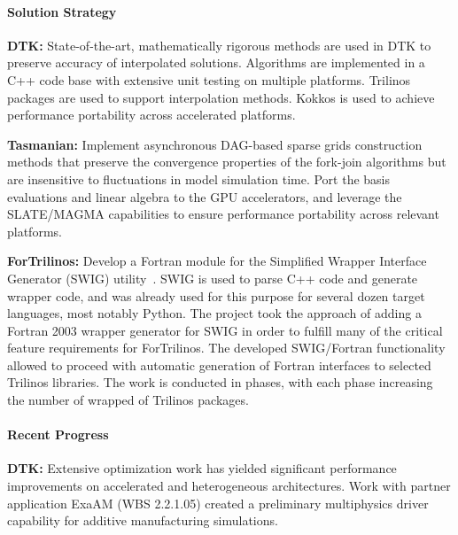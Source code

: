\paragraph{Solution Strategy}

\nobreak


\indent

{\bf DTK:} State-of-the-art, mathematically rigorous methods are used in DTK
to preserve accuracy of interpolated solutions.  Algorithms are implemented in
a C++ code base with extensive unit testing on multiple platforms.  Trilinos
packages are used to support interpolation methods.  Kokkos is used to achieve
performance portability across accelerated platforms.

{\bf Tasmanian:} Implement asynchronous DAG-based sparse grids construction
methods that preserve the convergence properties of the fork-join algorithms
but are insensitive to fluctuations in model simulation time.  Port the basis
evaluations and linear algebra to the GPU accelerators, and leverage the
SLATE/MAGMA capabilities to ensure performance portability across relevant
platforms.

{\bf ForTrilinos:} Develop a Fortran module for the Simplified Wrapper
Interface Generator (SWIG) utility~\cite{beazley1996swig}. SWIG is used to parse
C++ code and generate wrapper code, and was already used for this purpose for
several dozen target languages, most notably Python. The project took the
approach of adding a Fortran 2003 wrapper generator for SWIG in order to
fulfill many of the critical feature requirements for ForTrilinos.
The developed SWIG/Fortran functionality allowed to proceed with automatic
generation of Fortran interfaces to selected Trilinos libraries. The work is
conducted in phases, with each phase increasing the number of wrapped of
Trilinos packages.


\paragraph{Recent Progress}

\indent

{\bf DTK:} Extensive optimization work has yielded significant performance
improvements on accelerated and heterogeneous architectures. Work with partner
application ExaAM (WBS 2.2.1.05) created a preliminary multiphysics driver
capability for additive manufacturing simulations.


